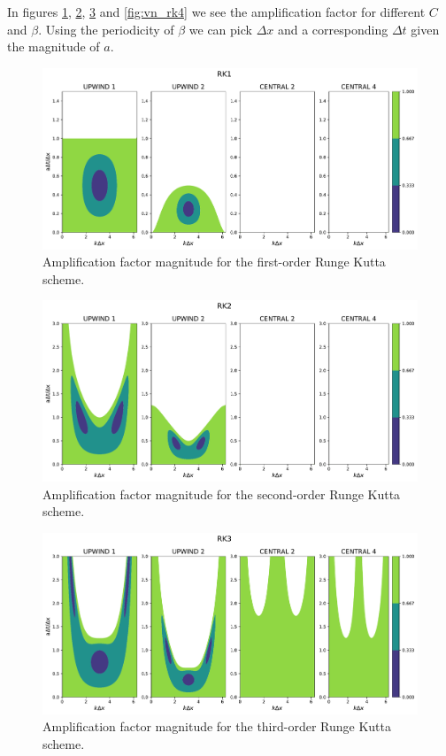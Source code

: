 \documentclass{article}
\begin{document}
In figures \ref{fig:vn_rk1}, \ref{fig:vn_rk2}, \ref{fig:vn_rk3} and \ref{fig:vn_rk4} we see the amplification factor for different $C$ and $\beta$. Using the periodicity of $\beta$ we can pick $\Delta x$ and a corresponding $\Delta t$ given the magnitude of $a$.

\begin{figure}[htbp]
    \centering
    \includegraphics[width=0.8\linewidth]{./vn_rk1.pdf} %
    \caption{Amplification factor magnitude for the first-order Runge Kutta scheme.}
    \label{fig:vn_rk1} %
\end{figure}

\begin{figure}[htbp]
    \centering
    \includegraphics[width=0.8\linewidth]{./vn_rk2.pdf} %
    \caption{Amplification factor magnitude for the second-order Runge Kutta scheme.}
    \label{fig:vn_rk2} %
\end{figure}

\begin{figure}[htbp]
    \centering
    \includegraphics[width=0.8\linewidth]{./vn_rk3.pdf} %
    \caption{Amplification factor magnitude for the third-order Runge Kutta scheme.}
    \label{fig:vn_rk3} %
\end{figure}
\end{document}
